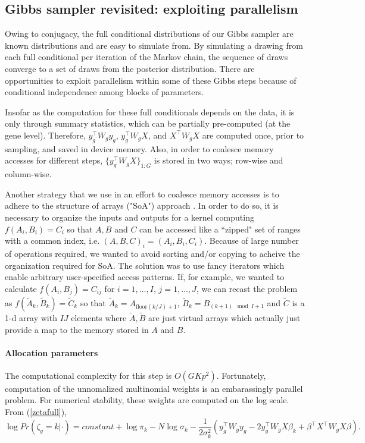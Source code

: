 {\subsection{Gibbs sampler revisited: exploiting parallelism}
\label{subsec:gibbs-revisited}
Owing to conjugacy, the full conditional distributions of our Gibbs sampler are known distributions and are easy to simulate from. By simulating a drawing from each full conditional per iteration of the Markov chain, the sequence of draws converge to a set of draws from the posterior distribution. There are opportunities to exploit parallelism within some of these Gibbs steps because of conditional independence among blocks of parameters. 

Insofar as the computation for these full conditionals depends on the data, it is only through summary statistics, which can be partially pre-computed (at the gene level). Therefore, $y_g^\top W_g y_g$, $y_g^\top W_g X$, and $X^\top W_g X$ are computed once, prior to sampling, and saved in device memory. Also, in order to coalesce memory accesses for different steps, $\{y_g^\top W_g X\}_{1:G}$ is stored in two ways; row-wise and column-wise.

Another strategy that we use in an effort to coalesce memory accesses is to adhere to the structure of arrays ("SoA") approach \citep{thrustslides}. In order to do so, it is necessary to organize the inputs and outputs for a kernel computing $f(A_i,B_i)=C_i$ so that $A, B$ and $C$ can be accessed like a ``zipped" set of ranges with a common index, i.e. $(A,B,C)_i = (A_i,B_i,C_i)$. Because of large number of operations required, we wanted to avoid sorting and/or copying to acheive the organization required for SoA. The solution was to use fancy iterators which enable arbitrary user-specified access patterns. If, for example, we wanted to calculate $f(A_i,B_j)=C_{ij}$ for $i=1,\ldots,I$, $j=1,\ldots,J$, we can recast the problem as $f(\tilde{A}_k,\tilde{B}_k)=\tilde{C}_k$ so that $\tilde{A}_k=A_{\mbox{floor}(k/J)+1}$, $\tilde{B}_k=B_{(k+1) \mod I +1}$ and $\tilde{C}$ is a 1-d array with $IJ$ elements where $\tilde{A},\tilde{B}$ are just virtual arrays which actually just provide a map to the memory stored in $A$ and $B$. 

\paragraph{Allocation parameters}
The computational complexity for this step is $O(GKp^2)$. Fortunately, computation of the unnomalized multinomial weights is an embarassingly parallel problem. For numerical stability, these weights are computed on the log scale. From (\ref{zetafull}),
\begin{equation}
\label{logweight}
\log Pr(\zeta_g=k|\cdot) = constant + \log \pi_k -N \log \sigma_k - \frac{1}{2\sigma^2_k}\left(y_g^\top W_g y_g - 2y_g^\top W_g X \beta_k + \beta^\top X^\top W_g X \beta \right).
\end{equation}

}
